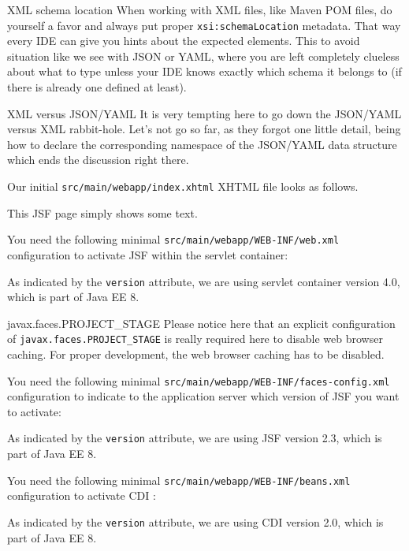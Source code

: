 \begin{TIP}{XML schema location}
	When working with XML files, like Maven POM files, do yourself a favor and always put proper \texttt{xsi:schemaLocation} metadata.
	That way every IDE can give you hints about the expected elements.
	This to avoid situation like we see with JSON or YAML, where you are left completely clueless about what to type unless your IDE knows exactly which schema it belongs to (if there is already one defined at least).
\end{TIP}

\begin{ClownComputing}{XML versus JSON/YAML}
	It is very tempting here to go down the JSON/YAML versus XML rabbit-hole.
	Let's not go so far, as they forgot one little detail, being how to declare the corresponding namespace of the JSON/YAML data structure which ends the discussion right there.
\end{ClownComputing}

Our initial \texttt{src/main/webapp/index.xhtml} XHTML file looks as follows.

This JSF page simply shows some text.

You need the following minimal \texttt{src/main/webapp/WEB-INF/web.xml} configuration to activate JSF within the servlet container:

As indicated by the \texttt{version} attribute, we are using servlet container version 4.0, which is part of Java EE 8.
\begin{TIP}{javax.faces.PROJECT\_STAGE}
Please notice here that an explicit configuration of \texttt{javax.faces.PROJECT\_STAGE} is really required here to disable web browser caching.
For proper development, the web browser caching has to be disabled.
\end{TIP}

You need the following minimal \texttt{src/main/webapp/WEB-INF/faces-config.xml} configuration to indicate to the application server which version of JSF you want to activate:

As indicated by the \texttt{version} attribute, we are using JSF version 2.3, which is part of Java EE 8.

You need the following minimal \texttt{src/main/webapp/WEB-INF/beans.xml} configuration to activate CDI \cite{CDI2}:

As indicated by the \texttt{version} attribute, we are using CDI version 2.0, which is part of Java EE 8.

